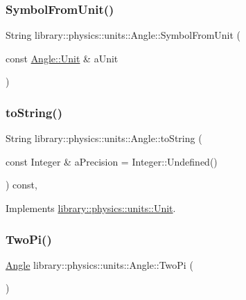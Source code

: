 \subsubsection{\texorpdfstring{Symbol\+From\+Unit()}{SymbolFromUnit()}}
{\footnotesize\ttfamily String library\+::physics\+::units\+::\+Angle\+::\+Symbol\+From\+Unit (\begin{DoxyParamCaption}\item[{const \hyperlink{classlibrary_1_1physics_1_1units_1_1_angle_a3c329d415a61783b16ce481874cc5956}{Angle\+::\+Unit} \&}]{a\+Unit }\end{DoxyParamCaption})\hspace{0.3cm}{\ttfamily [static]}}

\mbox{\label{classlibrary_1_1physics_1_1units_1_1_angle_aae6b7bd4e028ea7719f5a712ca19a86c}} 
\subsubsection{\texorpdfstring{to\+String()}{toString()}}
{\footnotesize\ttfamily String library\+::physics\+::units\+::\+Angle\+::to\+String (\begin{DoxyParamCaption}\item[{const Integer \&}]{a\+Precision = {\ttfamily Integer\+:\+:Undefined()} }\end{DoxyParamCaption}) const\hspace{0.3cm}{\ttfamily [override]}, {\ttfamily [virtual]}}



Implements \hyperlink{classlibrary_1_1physics_1_1units_1_1_unit_aac05cb6ed1ea7c18c233a3381c81caf8}{library\+::physics\+::units\+::\+Unit}.

\mbox{\label{classlibrary_1_1physics_1_1units_1_1_angle_a7ff0185d33abbb7b3fdcbef1bbb19f74}} 
\subsubsection{\texorpdfstring{Two\+Pi()}{TwoPi()}}
{\footnotesize\ttfamily \hyperlink{classlibrary_1_1physics_1_1units_1_1_angle}{Angle} library\+::physics\+::units\+::\+Angle\+::\+Two\+Pi (\begin{DoxyParamCaption}{ }\end{DoxyParamCaption})\hspace{0.3cm}{\ttfamily [static]}}


